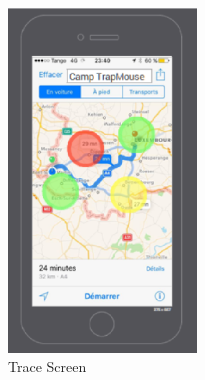 \begin{figure}[htbp]
\begin{center}
 \caption{\label{fig:A10} Trace Screen}
   \includegraphics[width=50mm]{./images/App/traceroute.eps}
\end{center}
\end{figure} 




